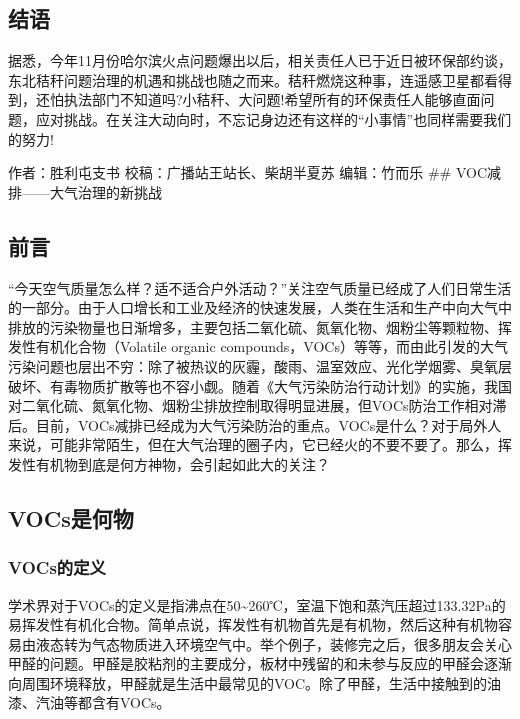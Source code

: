\documentclass[]{book}
\begin{document}
\subsection{结语}\label{-1}

据悉，今年11月份哈尔滨火点问题爆出以后，相关责任人已于近日被环保部约谈，东北秸秆问题治理的机遇和挑战也随之而来。秸秆燃烧这种事，连遥感卫星都看得到，还怕执法部门不知道吗?小秸秆、大问题!希望所有的环保责任人能够直面问题，应对挑战。在关注大动向时，不忘记身边还有这样的``小事情''也同样需要我们的努力!

作者：胜利屯支书 校稿：广播站王站长、柴胡半夏苏 编辑：竹而乐 \#\#
VOC减排------大气治理的新挑战

\subsection{前言}\label{-1}

``今天空气质量怎么样？适不适合户外活动？''关注空气质量已经成了人们日常生活的一部分。由于人口增长和工业及经济的快速发展，人类在生活和生产中向大气中排放的污染物量也日渐增多，主要包括二氧化硫、氮氧化物、烟粉尘等颗粒物、挥发性有机化合物（Volatile
organic
compounds，VOCs）等等，而由此引发的大气污染问题也层出不穷：除了被热议的灰霾，酸雨、温室效应、光化学烟雾、臭氧层破坏、有毒物质扩散等也不容小觑。随着《大气污染防治行动计划》的实施，我国对二氧化硫、氮氧化物、烟粉尘排放控制取得明显进展，但VOCs防治工作相对滞后。目前，VOCs减排已经成为大气污染防治的重点。VOCs是什么？对于局外人来说，可能非常陌生，但在大气治理的圈子内，它已经火的不要不要了。那么，挥发性有机物到底是何方神物，会引起如此大的关注？

\subsection{VOCs是何物}\label{vocs}

\subsubsection{VOCs的定义}\label{vocs}

学术界对于VOCs的定义是指沸点在50\textasciitilde{}260℃，室温下饱和蒸汽压超过133.32Pa的易挥发性有机化合物。简单点说，挥发性有机物首先是有机物，然后这种有机物容易由液态转为气态物质进入环境空气中。举个例子，装修完之后，很多朋友会关心甲醛的问题。甲醛是胶粘剂的主要成分，板材中残留的和未参与反应的甲醛会逐渐向周围环境释放，甲醛就是生活中最常见的VOC。除了甲醛，生活中接触到的油漆、汽油等都含有VOCs。
\end{document}
